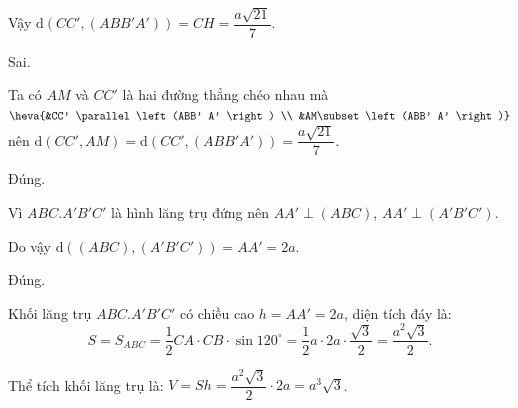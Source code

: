 \begin{ex}
{\begin{itemchoice}
			Vậy $\mathrm{d}\left(CC', \left(ABB' A' \right)\right)=CH=\dfrac{a\sqrt{21}}{7}$.
			
				\itemch Sai.
				
				Ta có $AM$ và $CC'$ là hai đường thẳng chéo nhau mà $\heva{&CC' \parallel \left(ABB' A' \right) \\ &AM\subset \left(ABB' A' \right)}$
			nên $\mathrm{d}\left(CC', AM\right)=\mathrm{d}\left(CC', \left(ABB' A' \right)\right)=\dfrac{a\sqrt{21}}{7}$.
		
			
		\itemch Đúng.
		
			Vì $ABC. A' B' C'$ là hình lăng trụ đứng nên $AA' \perp (ABC)$, $AA' \perp \left(A' B' C' \right)$.
			
			
				Do vậy $\mathrm{d}\left((ABC),\left(A' B' C' \right)\right)=AA'=2a$.
			
			\itemch Đúng.
			
			Khối lăng trụ $ABC.A' B' C'$ có chiều cao $h=AA'=2a$, diện tích đáy là:
			\[S=S_{ABC}=\dfrac{1}{2} CA\cdot CB\cdot \sin 120^{\circ}=\dfrac{1}{2} a\cdot 2a\cdot \dfrac{\sqrt{3}}{2}=\dfrac{a^2\sqrt{3}}{2}.\]
			
			Thể tích khối lăng trụ là: $V=Sh=\dfrac{a^2\sqrt{3}}{2} \cdot 2a=a^3\sqrt{3}$.
		\end{itemchoice}
	}
\end{ex}
